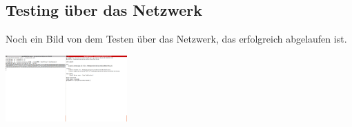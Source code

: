 \documentclass[11pt]{article}
\begin{document}
\subsection{Testing über das Netzwerk}

Noch ein Bild von dem Testen über das Netzwerk, das erfolgreich abgelaufen ist.
\begin{center}
  \includegraphics[width=\linewidth, height=1in]{test_network}
\end{center}

{}


\end{document}
